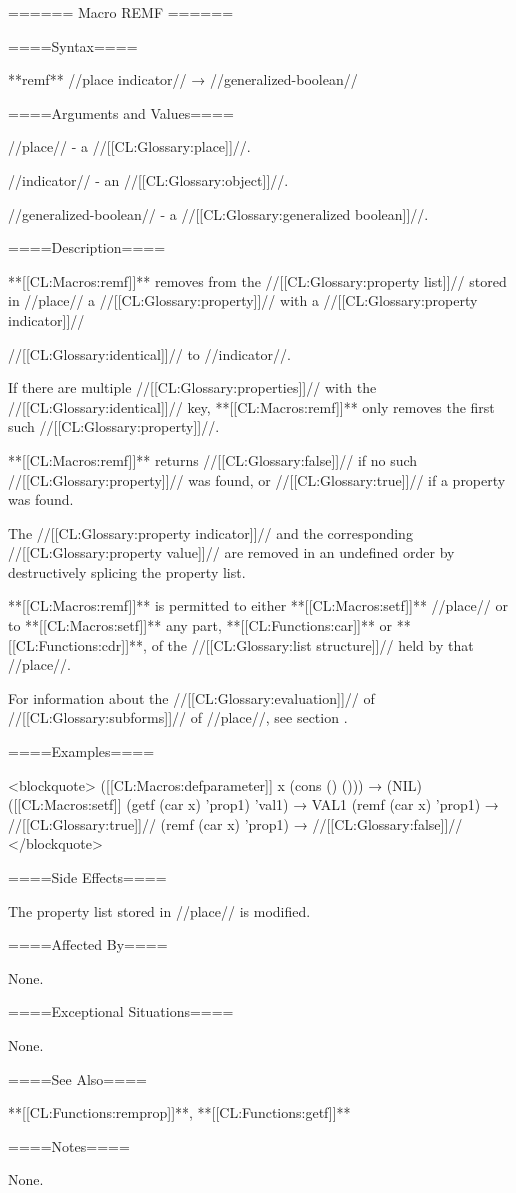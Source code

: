 ====== Macro REMF ======

====Syntax====

**remf** //place indicator// → //generalized-boolean//

====Arguments and Values====

//place// - a //[[CL:Glossary:place]]//.

//indicator// - an //[[CL:Glossary:object]]//.

//generalized-boolean// - a //[[CL:Glossary:generalized boolean]]//.

====Description====

**[[CL:Macros:remf]]** removes from the //[[CL:Glossary:property list]]// stored in //place// a //[[CL:Glossary:property]]// with a //[[CL:Glossary:property indicator]]//

//[[CL:Glossary:identical]]// to //indicator//.

If there are multiple //[[CL:Glossary:properties]]// with the //[[CL:Glossary:identical]]// key, **[[CL:Macros:remf]]** only removes the first such //[[CL:Glossary:property]]//.

**[[CL:Macros:remf]]** returns //[[CL:Glossary:false]]// if no such //[[CL:Glossary:property]]// was found, or //[[CL:Glossary:true]]// if a property was found.

The //[[CL:Glossary:property indicator]]// and the corresponding //[[CL:Glossary:property value]]// are removed in an undefined order by destructively splicing the property list.

**[[CL:Macros:remf]]** is permitted to either **[[CL:Macros:setf]]** //place// or to **[[CL:Macros:setf]]** any part, **[[CL:Functions:car]]** or **[[CL:Functions:cdr]]**, of the //[[CL:Glossary:list structure]]// held by that //place//.

For information about the //[[CL:Glossary:evaluation]]// of //[[CL:Glossary:subforms]]// of //place//, see section {\secref\GenRefSubFormEval}.

====Examples====

<blockquote> ([[CL:Macros:defparameter]] x (cons () ())) → (NIL) ([[CL:Macros:setf]] (getf (car x) 'prop1) 'val1) → VAL1 (remf (car x) 'prop1) → //[[CL:Glossary:true]]// (remf (car x) 'prop1) → //[[CL:Glossary:false]]// </blockquote>

====Side Effects====

The property list stored in //place// is modified.

====Affected By====

None.

====Exceptional Situations====

None.

====See Also====

**[[CL:Functions:remprop]]**, **[[CL:Functions:getf]]**

====Notes====

None.

  
